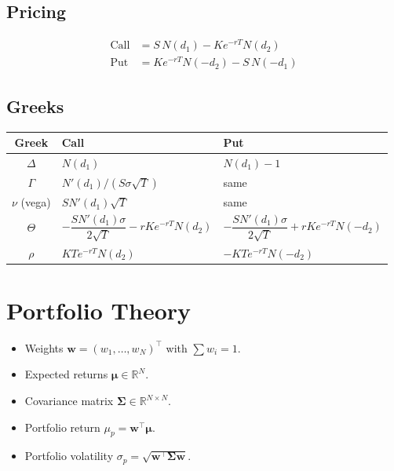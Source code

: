 \subsection{Pricing}

\begin{align}
\text{Call} &= S \, N(d_1) - K e^{-rT} N(d_2) \\
\text{Put}  &= K e^{-rT} N(-d_2) - S \, N(-d_1)
\end{align}

\subsection{Greeks}

\begin{center}
\begin{tabular}{cll}
\toprule
\textbf{Greek} & \textbf{Call} & \textbf{Put} \\
\midrule
$\Delta$ & $N(d_1)$ & $N(d_1) - 1$ \\
$\Gamma$ & $N'(d_1) / (S \sigma \sqrt{T})$ & same \\
$\nu$ (vega) & $S N'(d_1) \sqrt{T}$ & same \\
$\Theta$ & $-\dfrac{S N'(d_1) \sigma}{2\sqrt{T}} - r K e^{-rT} N(d_2)$ & $-\dfrac{S N'(d_1) \sigma}{2\sqrt{T}} + r K e^{-rT} N(-d_2)$ \\
$\rho$ & $K T e^{-rT} N(d_2)$ & $-K T e^{-rT} N(-d_2)$ \\
\bottomrule
\end{tabular}
\end{center}

\section{Portfolio Theory}

\begin{itemize}
    \item Weights $\mathbf{w} = (w_1, \dots, w_N)^\top$ with
      $\sum w_i = 1$.
    \item Expected returns $\boldsymbol{\mu} \in \mathbb{R}^N$.
    \item Covariance matrix $\boldsymbol{\Sigma} \in \mathbb{R}^{N \times N}$.
    \item Portfolio return $\mu_p = \mathbf{w}^\top \boldsymbol{\mu}$.
    \item Portfolio volatility $\sigma_p = \sqrt{\mathbf{w}^\top \boldsymbol{\Sigma} \mathbf{w}}$.
\end{itemize}

